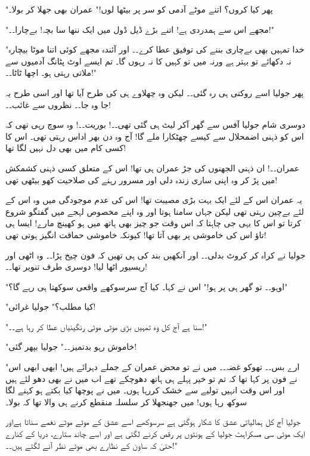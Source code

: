 "پھر کیا کروں؟ اتنے موٹے آدمی کو سر پر بیٹھا لوں!" عمران بھی جھلا کر بولا۔

"مجھے اس سے ہمدردی ہے! اتنے بڑے ڈیل ڈول میں ایک ننھا سا بچہ! بےچارا۔۔!"

"خدا تمہیں بھی بےچاری بننے کی توفیق عطا کرے۔۔ اور آئندہ مجھے کوئی اتنا موٹا بیچارہ نہ دکھائے تو بہتر ہے ورنہ میں تو کہیں کا نہ رہوں گا۔ تم ایسے اوٹ پٹانگ آدمیوں سے ملاتی رہتی ہو۔ اچھا ٹاٹا۔۔!"

پھر جولیا اسے روکتی ہی رہ گئی۔۔ لیکن وہ چھلاوے ہی کی طرح آیا تھا اور اسی طرح یہ جا وہ جا۔۔ نظروں سے غائب۔۔!



\endR

\bigskip\bigskip\bigskip

\centerline{}
\bigskip\bigskip\bigskip
\beginR
\body


دوسری شام جولیا آفس سے گھر آکر لیٹ ہی گئی تھی۔۔! بوریت۔۔! وہ سوچ رہی تھی کہ اس کو ذہنی اضمحلال سے کیسے چھٹکارا ملے گا! آج وہ دن بھر اداس رہتی تھی۔ اس کا کسی کام میں بھی دل نہیں لگا تھا!

عمران۔۔! ان ذہنی الجھنوں کی جڑ عمران ہی تھا! اس کے متعلق کسی ذہنی کشمکش میں پڑ کر وہ اپنی ساری زندہ دلی اور مسرور رہنے کی صلاحیت کھو بیٹھی تھی!

یہ عمران اس کے لئے ایک بہت بڑی مصیبت تھا! اس کی عدم موجودگی میں وہ اس کے لئے بےچین رہتی تھی لیکن جہاں سامنا ہوتا اور وہ اپنے مخصوص لہجے میں گفتگو شروع کرتا تو اس کا یہی جی چاہتا کہ اس وقت جو چیز بھی ہاتھ میں ہو کھینچ مارے! ایسا ہی تاؤ اس کی خاموشی پر بھی آتا تھا! کیونکہ خاموشی حماقت انگیز ہوتی تھی!

جولیا نے کراہ کر کروٹ بدلی۔۔ اور آنکھیں بند کی ہی تھیں کہ فون چیخ پڑا۔۔ وہ اٹھی اور ریسیور اٹھا لیا! دوسری طرف تنویر تھا۔۔!

"اوہو۔۔ تو گھر ہی پر ہو!" اس نے کہا۔ کیا آج سرسوکھے واقعی سوکھتا ہی رہے گا؟"

"کیا مطلب؟" جولیا غرائی!

"سنا ہے آج کل وہ تمہیں بڑی موٹی موٹی رنگینیاں عطا کر رہا ہے۔۔!"

"خاموش رہو بدتمیز۔۔" جولیا بپھر گئی!

"ارے بس۔۔ تھوکو غضہ۔۔ میں نے تو محض عمران کے جملے دہرائے ہیں! ابھی ابھی اس نے فون پر کہا تھا کہ تم تو خیر پہلے ہی ہاتھ دھوچکے تھے اب میں نے بھی دھو لئے ہیں اور اس وقت انہیں تولیے سے خشک کررہا ہوں۔ میں نے پوچھا کیا بکتے ہو کہنے لگا سوکھ رہا ہوں! میں جھنجھلا کر سلسلہ منقطع کرنے ہی والا تھا کہ بولا۔

جولیا آج کل ہمالیاتی عشق کا شکار ہوگئی ہے سرسوکھے اسے عشق کے موٹے موٹے نغمے سناتا ہےاور ایک موٹی سی مسکراہٹ جولیا کے ہونٹوں پر رقص کرنے لگتی ہے اور اسے چاند ستارے، دریا کے کنارے حتیٰ کہ ساون کے نظارے بھی موٹے نظر آنے لگتے ہیں۔۔!"

